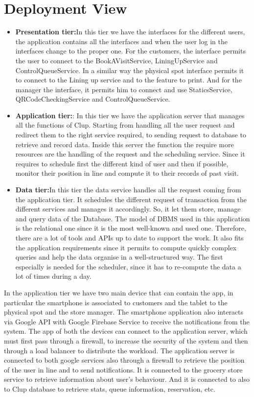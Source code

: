 \section{Deployment View}
\begin{itemize}
	\item \textbf{Presentation tier:}In this tier we have the interfaces for the different users, the application contains all the interfaces and when the user log in the interfaces change to the proper one. For the customers, the interface permits the user to connect to the BookAVisitService, LiningUpService and ControlQueueService. In a similar way the physical spot interface permits it to connect to the Lining up service and to the feature to print. And for the manager the interface, it permits him to connect and use StaticsService, QRCodeCheckingService and ControlQueueService.

	\item \textbf{Application tier:}: In this tier we have the application server that manages all the functions of Clup. Starting from handling all the user request and redirect them to the right service required, to sending request to database to retrieve and record data. Inside this server the function the require more resources are the handling of the request and the scheduling service. Since it requires to schedule first the different kind of user and then if possible, monitor their position in line and compute it to their records of past visit.

	\item \textbf{Data tier:}In this tier the data service handles all the request coming from the application tier. It schedules the different request of transaction from the different services and manages it accordingly. So, it let them store, manage and query data of the Database. The model of DBMS used in this application is the relational one since it is the most well-known and used one. Therefore, there are a lot of tools and APIs up to date to support the work. It also fits the application requirements since it permits to compute quickly complex queries and help the data organise in a well-structured way. The first especially is needed for the scheduler, since it has to re-compute the data a lot of times during a day. 
\end{itemize}
In the application tier we have two main device that can contain the app, in particular the smartphone is associated to customers and the tablet to the physical spot and the store manager. The smartphone application also interacts via Google API with Google Firebase Service to receive the notifications from the system. The app of both the devices can connect to the application server, which must first pass through a firewall, to increase the security of the system and then through a load balancer to distribute the workload. 
The application server is connected to both google services also through a firewall to retrieve the position of the user in line and to send notifications. It is connected to the grocery store service to retrieve information about user’s behaviour. And it is connected to also to Clup database to retrieve stats, queue information, reservation, etc. 

